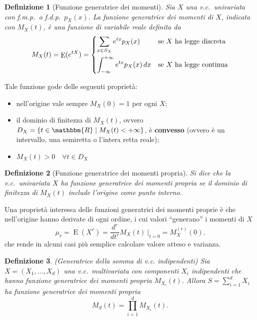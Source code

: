 \documentclass[11pt,a4paper,twoside]{article}
\newtheorem{definition}{Definizione}
\newcommand\R{\mathbbm{R}}
\newcommand\dx{\,dx}
\newcommand{\computedat}[1]{\:\bigg\rvert_{#1}}
\DeclareMathOperator{\E}{E}
\begin{document}
\begin{definition}[Funzione generatrice dei momenti]
  Sia \(X\) una v.c.\ univariata con f.m.p.\ o f.d.p.\ \(p_X(x)\).  La
  funzione generatrice dei momenti di \(X\), indicata con \(M_X(t)\),
  è una funzione di variabile reale definita da
  \[
    M_X(t) = \E(e^{tX}) = \begin{dcases}
      \sum_{x\in S_X} e^{tx} p_X(x) &\mbox{se \(X\) ha legge discreta} \\
      \int_{-\infty}^{+\infty} e^{tx} p_X(x) \dx &\mbox{se \(X\) ha
        legge continua}
    \end{dcases}
  \]
\end{definition}

Tale funzione gode delle seguenti proprietà:
\begin{itemize}
\item nell'origine vale sempre \(M_X(0) = 1\) per ogni \(X\);
\item il dominio di finitezza di \(M_X(t)\), ovvero \(D_X = \{ t\in\R
  \mid M_X(t) < +\infty \}\), è \textbf{convesso} (ovvero è un
  intervallo, una semiretta o l'intera retta reale);
\item \(M_X(t) > 0 \quad\forall t\in D_X\)
\end{itemize}

\begin{definition}[Funzione generatrice dei momenti propria]
  Si dice che la v.c.\ univariata \(X\) ha funzione generatrice dei
  momenti propria se il dominio di finitezza di \(M_X(t)\) include
  l'origine come punto interno.
\end{definition}

Una proprietà interessa delle funzioni generatrici dei momenti proprie
è che nell'origine hanno derivate di ogni ordine, i cui valori
``generano'' i momenti di \(X\)
\[
  \mu_r = \E(X^r) = \frac{d^r}{dt^r} M_X(t) \computedat{t = 0} = M_X^{(r)}(0).
\]
che rende in alcuni casi più semplice calcolare valore atteso e varianza.

\begin{definition}(Generatrice della somma di v.c. indipendenti) Sia
  \(X = (X_1, \dots, X_d)\) una v.c.\ multivariata con componenti
  \(X_i\) indipendenti che hanno funzione generatrice dei momenti
  propria \(M_{X_i}(t)\).  Allora \(S = \sum_{i=1}^d X_i\) ha funzione
  generatrice dei momenti propria
  \[
    M_S(t) = \prod_{i=1}^d M_{X_i}(t).
  \]
\end{definition}
\end{document}

